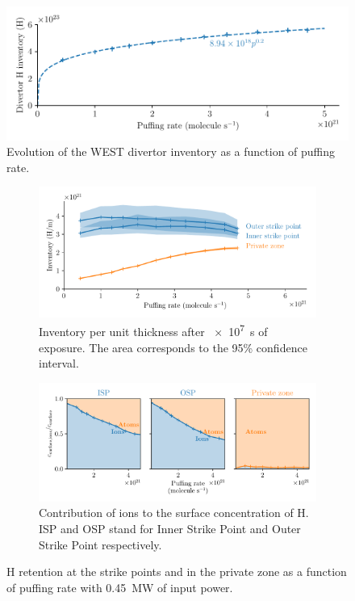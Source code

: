 \begin{figure}[h]
    \centering
    \includegraphics[width=\linewidth]{Figures/divertor/WEST/inventory_vs_puffing_rate.pdf}
    \caption{Evolution of the WEST divertor inventory as a function of puffing rate.}
    \label{fig: inventory vs puff rate}
\end{figure}

\begin{figure}[h!]
    \centering
    \begin{subfigure}{\linewidth}
        \includegraphics[width=\linewidth]{Figures/divertor/WEST/inventory_at_sp_and_private_zone.pdf}
        \caption{Inventory per unit thickness after \SI{e7}{s} of exposure. The area corresponds to the 95\% confidence interval.}
        \label{fig: local retention vs puff rate}
    \end{subfigure}
    \begin{subfigure}{\linewidth}
        \includegraphics[width=\linewidth]{Figures/divertor/WEST/ion_ratio_at_sp_and_private_zone.pdf}
        \caption{Contribution of ions to the surface concentration of H. ISP and OSP stand for Inner Strike Point and Outer Strike Point respectively.}
        \label{fig: ion contribution vs puff rate}
    \end{subfigure}%
    \caption{H retention at the strike points and in the private zone as a function of puffing rate with \SI{0.45}{MW} of input power.}
\end{figure}

